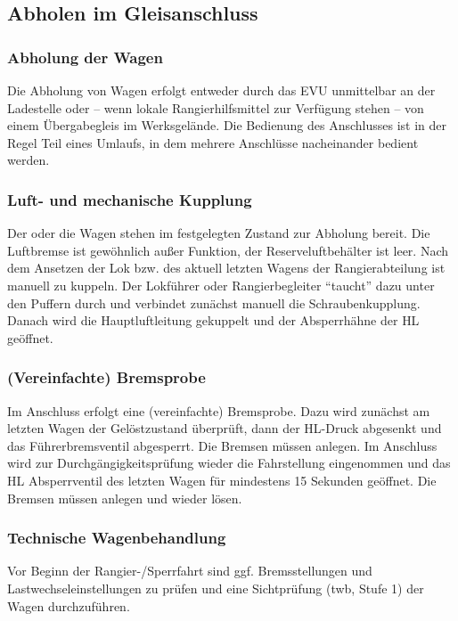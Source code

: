 \subsection{Abholen im Gleisanschluss}
\subsubsection{Abholung der Wagen}
Die Abholung von Wagen erfolgt entweder durch das \acrshort{EVU} unmittelbar an der Ladestelle oder -- wenn lokale Rangierhilfsmittel zur Verfügung stehen -- von einem Übergabegleis im Werksgelände. Die Bedienung des Anschlusses ist in der Regel Teil eines Umlaufs, in dem mehrere Anschlüsse nacheinander bedient werden.
\subsubsection{Luft- und mechanische Kupplung}\label{sec:LuftumechKup}
Der oder die Wagen stehen im festgelegten Zustand zur Abholung bereit. Die Luftbremse ist gewöhnlich außer Funktion, der Reserveluftbehälter ist leer. Nach dem Ansetzen der Lok bzw. des aktuell letzten Wagens der Rangierabteilung ist manuell zu kuppeln. Der Lokführer oder Rangierbegleiter "`taucht"' dazu unter den Puffern durch und verbindet zunächst manuell die Schraubenkupplung. Danach wird die Hauptluftleitung gekuppelt und der Absperrhähne der \acrshort{HL} geöffnet. %
\subsubsection{(Vereinfachte) Bremsprobe}\label{sec:vBremsprobe}
Im Anschluss erfolgt eine (vereinfachte) \gls{Bremsprobe}. Dazu wird zunächst am letzten Wagen der Gelöstzustand überprüft, dann der \acrshort{HL}-Druck abgesenkt und das Führerbremsventil abgesperrt. Die Bremsen müssen anlegen. Im Anschluss wird zur Durchgängigkeitsprüfung wieder die Fahrstellung eingenommen und das \acrshort{HL} Absperrventil des letzten Wagen für mindestens 15 Sekunden geöffnet. Die Bremsen müssen anlegen und wieder lösen.
\subsubsection{Technische Wagenbehandlung}\label{sec:tWb}
Vor Beginn der Rangier-/\gls{Sperrfahrt} sind ggf. Bremsstellungen %
und Lastwechseleinstellungen zu prüfen und eine Sichtprüfung (\acrshort{twb}, Stufe 1) der Wagen durchzuführen. 
